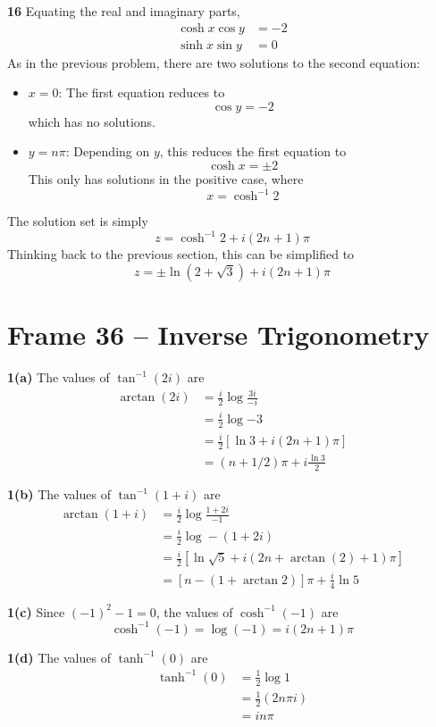 \documentclass{article}
\begin{document}
\textbf{16}
Equating the real and imaginary parts,
\begin{align*}
	\cosh x \cos y &= -2 \\
	\sinh x \sin y &= 0
\end{align*}
As in the previous problem, there are two solutions to the second equation:
\begin{itemize}
	\item $x = 0$: The first equation reduces to
	\[
		\cos y = -2
	\]
	which has no solutions.
	
	\item $y = n\pi$: Depending on $y$, this reduces the first equation to
	\[
		\cosh x = \pm 2
	\]
	This only has solutions in the positive case, where
	\[
		x = \cosh^{-1} 2
	\]
\end{itemize}
The solution set is simply
\[
	z = \cosh^{-1} 2 + i(2n + 1)\pi
\]
Thinking back to the previous section, this can be simplified to
\[
	z = \pm \ln(2 + \sqrt{3}) + i(2n + 1)\pi
\]


\clearpage
\section{Frame 36 -- Inverse Trigonometry}
\textbf{1(a)}
The values of $\tan^{-1}(2i)$ are
\begin{align*}
	\arctan(2i) 
	&= \frac{i}{2} \log \frac{3i}{-i} \\
	&= \frac{i}{2} \log {-3} \\
	&= \frac{i}{2} [\ln 3 + i(2n + 1)\pi] \\
	&= (n + 1/2)\pi + i \frac{\ln 3}{2}
\end{align*}

\textbf{1(b)}
The values of $\tan^{-1}(1 + i)$ are
\begin{align*}
	\arctan(1 + i)
	&= \frac{i}{2} \log \frac{1 + 2i}{-1} \\
	&= \frac{i}{2} \log -(1 + 2i) \\
	&= \frac{i}{2} [\ln \sqrt{5} + i(2n + \arctan(2) + 1)\pi] \\
	&= [n - (1 + \arctan 2 )]\pi + \frac{i}{4} \ln 5  
\end{align*}

\textbf{1(c)}
Since $(-1)^2 - 1 = 0$, the values of $\cosh^{-1}(-1)$ are
\[
	\cosh^{-1}(-1) = \log(-1)
	= i(2n + 1)\pi
\]

\textbf{1(d)}
The values of $\tanh^{-1}(0)$ are
\begin{align*}
	\tanh^{-1}(0)
	&= \frac{1}{2} \log 1 \\
	&= \frac{1}{2} (2n\pi i) \\
	&= i n\pi
\end{align*}
\end{document}
